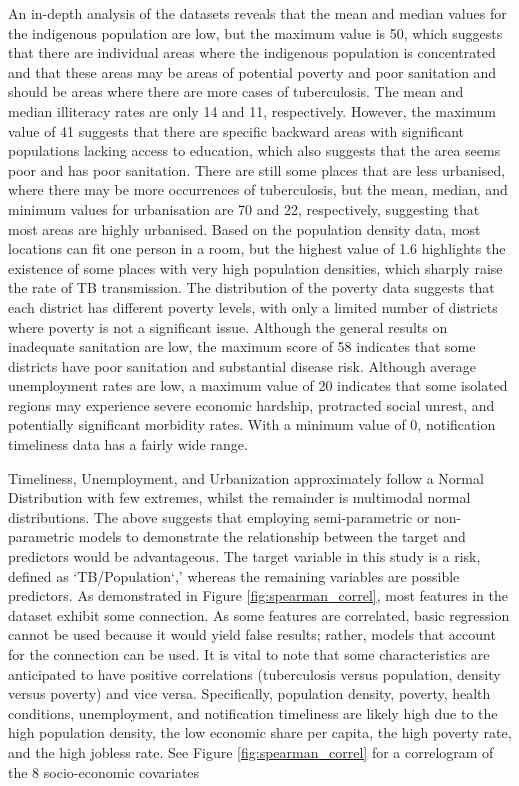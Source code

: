 An in-depth analysis of the datasets reveals that the mean and median values for the indigenous population are low, but the maximum value is 50, which suggests that there are individual areas where the indigenous population is concentrated and that these areas may be areas of potential poverty and poor sanitation and should be areas where there are more cases of tuberculosis. The mean and median illiteracy rates are only 14 and 11, respectively. However, the maximum value of 41 suggests that there are specific backward areas with significant populations lacking access to education, which also suggests that the area seems poor and has poor sanitation. There are still some places that are less urbanised, where there may be more occurrences of tuberculosis, but the mean, median, and minimum values for urbanisation are 70 and 22, respectively, suggesting that most areas are highly urbanised. Based on the population density data, most locations can fit one person in a room, but the highest value of 1.6 highlights the existence of some places with very high population densities, which sharply raise the rate of TB transmission. The distribution of the poverty data suggests that each district has different poverty levels, with only a limited number of districts where poverty is not a significant issue. Although the general results on inadequate sanitation are low, the maximum score of 58 indicates that some districts have poor sanitation and substantial disease risk. Although average unemployment rates are low, a maximum value of 20 indicates that some isolated regions may experience severe economic hardship, protracted social unrest, and potentially significant morbidity rates. With a minimum value of 0, notification timeliness data has a fairly wide range.

Timeliness, Unemployment, and Urbanization approximately follow a Normal Distribution with few extremes, whilst the remainder is multimodal normal distributions. The above suggests that employing semi-parametric or non-parametric models to demonstrate the relationship between the target and predictors would be advantageous. The target variable in this study is a risk, defined as `TB/Population`,' whereas the remaining variables are possible predictors. As demonstrated in Figure \ref{fig:spearman_correl}, most features in the dataset exhibit some connection. As some features are correlated, basic regression cannot be used because it would yield false results; rather, models that account for the connection can be used. It is vital to note that some characteristics are anticipated to have positive correlations (tuberculosis versus population, density versus poverty) and vice versa. Specifically, population density, poverty, health conditions, unemployment, and notification timeliness are likely high due to the high population density, the low economic share per capita, the high poverty rate, and the high jobless rate. See Figure \ref{fig:spearman_correl} for a correlogram of the 8 socio-economic covariates



